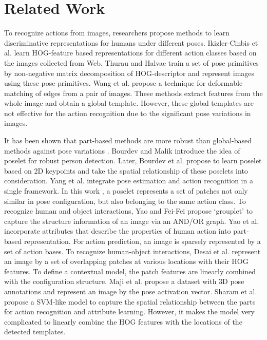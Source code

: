 \documentclass[journal]{IEEEtran}
\begin{document}
\section{Related Work}
\label{Sec:Related_work}

To recognize actions from images, researchers propose methods to learn discriminative representations for humans under different poses. Ikizler-Cinbis et al. \cite{ikizlercinbisICCV2009} learn HOG-feature based representations for different action classes based on the images collected from Web. Thurau and Halvac \cite{Thurau-HlavacPosePrimitivesCVPR2008} train a set of pose primitives by non-negative matrix decomposition of HOG-descriptor and represent images using these pose primitives. Wang et al. \cite{DBLP:conf/cvpr/WangJDLM06} propose a technique for deformable matching of edges from a pair of images. These methods \cite{ikizlercinbisICCV2009,Thurau-HlavacPosePrimitivesCVPR2008,DBLP:conf/cvpr/WangJDLM06} extract features from the whole image and obtain a global template. However, these global templates are not effective for the action recognition due to the significant pose variations in images.

It has been shown that part-based methods are more robust than global-based methods against pose variations \cite{YangWMCVPR10,FelzenszwalbMR_CVPR_2008}. Bourdev and Malik \cite{BourdevMalikICCV09} introduce the idea of poselet for robust person detection.
Later, Bourdev \cite{BourdevPoseletsECCV10} et al. propose to learn poselet based on 2D keypoints and take the spatial relationship of these poselets into consideration. Yang et al. \cite{YangWMCVPR10} integrate pose estimation and action recognition in a single framework. In this work \cite{YangWMCVPR10}, a poselet represents a set of patches not only similar in pose configuration, but also belonging to the same action class. To recognize human and object interactions, Yao and Fei-Fei \cite{GroupletYaoBangpengFeifeiLI} propose `grouplet' to capture the structure information of an image via an AND/OR graph.  Yao et al. \cite{Yao11humanaction__Stanford40} incorporate attributes that describe the properties of human action into part-based representation. For action prediction, an image is sparsely represented by a set of action bases. To recognize human-object interactions, Desai et al. \cite{desai10_action} represent an image by a set of overlapping patches at various locations with their HOG features. To define a contextual model, the patch features are linearly combined with the configuration structure. Maji et al. \cite{MajiActionCVPR11} propose a dataset with 3D pose annotations and represent an image by the pose activation vector. Sharam et al. \cite{sharma:CVPR2013} propose a SVM-like model to capture the spatial relationship between the parts for action recognition and attribute learning. However, it makes the model very complicated to linearly combine the HOG features with the locations of the detected templates.
\end{document}
